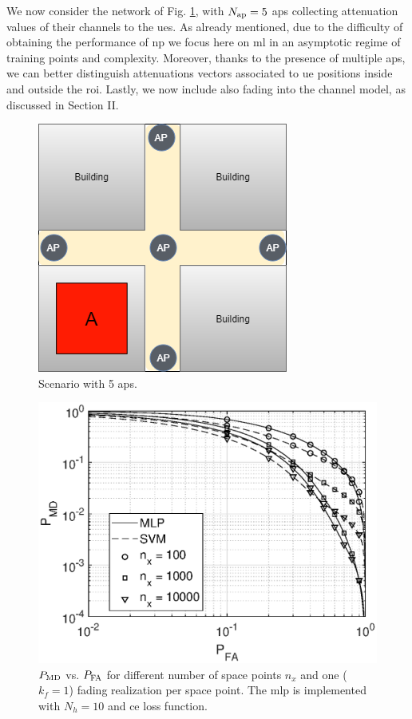 \documentclass[draftcls,onecolumn,12pt]{IEEEtran}
\begin{document}
We now consider the network of Fig. \ref{fig:mBS}, with $N_{\rm ap}=5$ \acp{ap} collecting attenuation values of their channels to the \acp{ue}. As already mentioned, due to the difficulty of obtaining the performance of \ac{np} we focus here on \ac{ml} in an asymptotic regime of training points and complexity. Moreover, thanks to the presence of multiple \acp{ap}, we can better distinguish attenuations vectors associated to \ac{ue} positions inside and outside the \ac{roi}. Lastly, we now include also fading into the channel model, as discussed in Section II.

\begin{figure}[t]
    \centering
    \includegraphics[width=0.5\columnwidth]{scenario2.png}
    \caption{Scenario with 5 \acp{ap}.} 
    \label{fig:mBS}
\end{figure}
\begin{figure}[t]
    \centering
    \includegraphics[width=0.6\columnwidth]{res_avg_nTrain_kf1.eps}
    \caption{$P_{\rm MD}$ vs. $P_{\rm FA}$ for different number of space points $n_x$ and one ($k_f=1$) fading realization per space point. The \ac{mlp} is implemented with $N_h = 10$ and \ac{ce} loss function.}
    \label{fig:kf1}
\end{figure}
\end{document}
